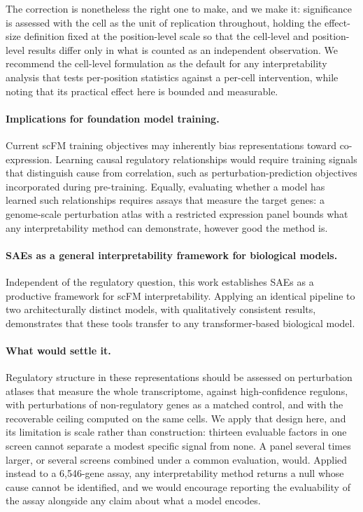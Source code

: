 \documentclass[onecolumn,11pt]{article}
\begin{document}
The correction is nonetheless the right one to make, and we make it: significance is assessed with
the cell as the unit of replication throughout, holding the effect-size definition fixed at the
position-level scale so that the cell-level and position-level results differ only in what is
counted as an independent observation. We recommend the cell-level formulation as the default for
any interpretability analysis that tests per-position statistics against a per-cell intervention,
while noting that its practical effect here is bounded and measurable.

\paragraph{Implications for foundation model training.}
Current scFM training objectives may inherently bias representations toward co-expression. Learning
causal regulatory relationships would require training signals that distinguish cause from
correlation, such as perturbation-prediction objectives incorporated during pre-training. Equally,
evaluating whether a model has learned such relationships requires assays that measure the target
genes: a genome-scale perturbation atlas with a restricted expression panel bounds what any
interpretability method can demonstrate, however good the method is.

\paragraph{SAEs as a general interpretability framework for biological models.}
Independent of the regulatory question, this work establishes SAEs as a productive framework for
scFM interpretability. Applying an identical pipeline to two architecturally distinct models, with
qualitatively consistent results, demonstrates that these tools transfer to any transformer-based
biological model.

\paragraph{What would settle it.}
Regulatory structure in these representations should be assessed on perturbation atlases that
measure the whole transcriptome, against high-confidence regulons, with perturbations of
non-regulatory genes as a matched control, and with the recoverable ceiling computed on the same
cells. We apply that design here, and its limitation is scale rather than construction: thirteen
evaluable factors in one screen cannot separate a modest specific signal from none. A panel several
times larger, or several screens combined under a common evaluation, would. Applied instead to a
6,546-gene assay, any interpretability method returns a null whose cause cannot be identified, and
we would encourage reporting the evaluability of the assay alongside any claim about what a model
encodes.
\end{document}
